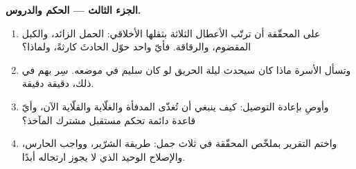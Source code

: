 \begin{problem}
\medskip\noindent\textbf{الجزء الثالث --- الحكم والدروس.}
\begin{enumerate}[resume]
  \item على المحقّقة أن ترتّب الأعطال الثلاثة بثقلها الأخلاقي:
        الحمل الزائد، والكبل المقضوم، والرقاقة. فأيّ واحد حوّل
        الحادثَ كارثةً، ولماذا؟
  \item وتسأل الأسرة ماذا كان سيحدث ليلة الحريق لو كان 
        سليم في موضعه. سِر بهم في ذلك، دقيقة دقيقة.
  \item وأوصِ بإعادة التوصيل: كيف ينبغي أن تُغذّى المدفأة
        والغلّاية والقلّاية الآن، وأيّ قاعدة دائمة تحكم مستقبل
        مشترك المآخذ؟
  \item واختم التقرير بملخّص المحقّقة في ثلاث جمل: طريقة
        الشرّير، وواجب الحارس، والإصلاح الوحيد الذي لا يجوز
        ارتجاله أبدًا.
\end{enumerate}
\end{problem}
